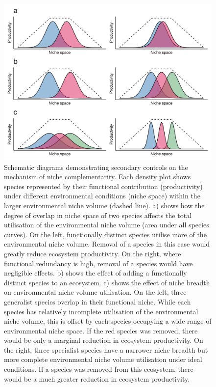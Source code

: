 \begin{refsection}
\begin{figure}
	\includegraphics[width=\linewidth]{img/niche_all}
	\caption[Schematic diagrams demonstrating secondary controls on niche complementarity]{Schematic diagrams demonstrating secondary controls on the mechanism of niche complementarity. Each density plot shows species represented by their functional contribution (productivity) under different environmental conditions (niche space) within the larger environmental niche volume (dashed line). a) shows how the degree of overlap in niche space of two species affects the total utilisation of the environmental niche volume (area under all species curves). On the left, functionally distinct species utilise more of the environmental niche volume. Removal of a species in this case would greatly reduce ecosystem productivity. On the right, where functional redundancy is high, removal of a species would have negligible effects. b) shows the effect of adding a functionally distinct species to an ecosystem. c) shows the effect of niche breadth on environmental niche volume utilisation. On the left, three generalist species overlap in their functional niche. While each species has relatively incomplete utilisation of the environmental niche volume, this is offset by each species occupying a wide range of environmental niche space. If the red species was removed, there would be only a marginal reduction in ecosystem productivity. On the right, three specialist species have a narrower niche breadth but more complete environmental niche volume utilisation under ideal conditions. If a species was removed from this ecosystem, there would be a much greater reduction in ecosystem productivity.}
	\label{background:niche_all}
\end{figure}


\end{refsection}
